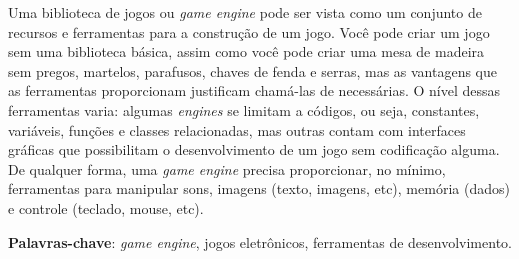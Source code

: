 \begin{resumo}

Uma biblioteca de jogos ou \textit{game engine} pode ser vista como um conjunto de recursos e ferramentas para a construção de um jogo. Você pode criar um jogo sem uma biblioteca básica, assim como você pode criar uma mesa de madeira sem pregos, martelos, parafusos, chaves de fenda e serras, mas as vantagens que as ferramentas proporcionam justificam chamá-las de necessárias.
O nível dessas ferramentas varia: algumas \textit{engines} se limitam a códigos, ou seja, constantes, variáveis, funções e classes relacionadas, mas outras contam com interfaces gráficas que possibilitam o desenvolvimento de um jogo sem codificação alguma. De qualquer forma, uma \textit{game engine} precisa proporcionar, no mínimo, ferramentas para manipular sons, imagens (texto, imagens, etc), memória (dados) e controle (teclado, mouse, etc).

\vspace{1em}
\textbf{Palavras-chave}: \textit{game engine}, jogos eletrônicos, ferramentas de desenvolvimento.
\end{resumo}